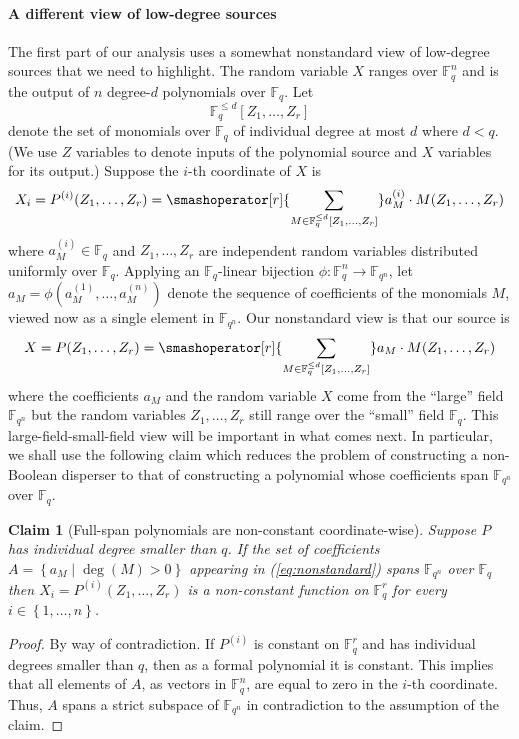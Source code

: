 \documentclass[10pt]{article}
\newtheorem{claim}[theorem]{Claim}
\theoremstyle{definition}
\numberwithin{equation}{section}
\newcommand{\set}[1]{\left \{{#1} \right \}}
\newcommand{\F}{\mathbb F_q}
\newcommand{\Fn}{\mathbb F_{q^n}}
\newcommand{\Fqn}{{\mathbb{F}_{q^n}}}
\newcommand{\monom}{\F^{\leq d}[Z_1,\ldots,Z_r]}
\newcommand{\condset}[2]{\set{#1 \mid  #2}}
\begin{document}
\paragraph{A different view of low-degree sources} The first part of
our analysis uses a somewhat nonstandard view of low-degree sources
that we need to highlight. The random variable $X$ ranges over $\F^n$
and is the output of $n$ degree-$d$ polynomials over $\F$. Let
\[
\monom
\]
denote the set of monomials over $\F$
of individual degree at most $d$ where $d<q$. (We use $Z$ variables to denote inputs of the polynomial source and $X$ variables for its output.) Suppose
%
the $i$-th
coordinate of $X$ is
\[X_i=P^{(i)}(Z_1, \ldots, Z_r)=\smashoperator[r]{\sum_{M\in \monom}} a^{(i)}_M \cdot M(Z_1,\ldots,Z_r) \]
where $a^{(i)}_M\in \F$ and $Z_1,\ldots, Z_r$ are independent random variables distributed uniformly over $\F$. Applying an $\F$-linear bijection $\phi:\F^n\to\Fqn$, let $a_M=\phi(a^{(1)}_M,\ldots,a^{(n)}_M)$ denote the sequence of coefficients of the monomials $M$, viewed now as a single element in $\Fqn$. Our nonstandard view is that our source is
\begin{equation}
  \label{eq:nonstandard} X=P(Z_1,\ldots, Z_r)= \smashoperator[r]{\sum_{M\in \monom}} a_M\cdot M(Z_1,\ldots,Z_r)
\end{equation}
where the coefficients $a_M$ and the random variable $X$ come from the ``large'' field $\Fqn$ but the random variables $Z_1,\ldots,Z_r$ still range over the ``small'' field $\F$. This large-field-small-field view will be important in what comes next. In particular, we shall use the following claim which reduces the problem of constructing a non-Boolean disperser to that of constructing a polynomial whose coefficients span $\Fn$ over $\F$.

\begin{claim}[Full-span polynomials are non-constant coordinate-wise]\label{clm:nonconstant}
Suppose $P$ has individual degree smaller than $q$.
If the set of coefficients $A=\condset{a_M}{\deg(M)>0}$ appearing in (\ref{eq:nonstandard}) spans $\Fn$ over $\F$
then $X_i=P^{(i)}(Z_1,\ldots,Z_r)$ is a non-constant function on $\F^r$ for every $i\in\set{1,\ldots,n}$.
\end{claim}

\begin{proof}
  By way of contradiction. If $P^{(i)}$ is constant on $\F^r$
and has individual degrees smaller than $q$, then as a formal polynomial
it is constant. This implies that all elements of $A$, as vectors in $\F^n$, are equal to zero in the
%
$i$-th coordinate.
Thus, $A$ spans a strict subspace of $\Fn$ in contradiction to the assumption of the claim.
\end{proof}
\end{document}
